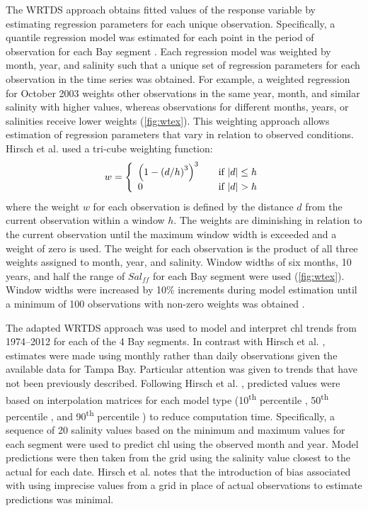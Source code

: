 \documentclass{svjour3}\usepackage[]{graphicx}\usepackage[]{color}
\newcommand{\nine}{90\textsuperscript{th} percentile }
\newcommand{\five}{50\textsuperscript{th} percentile }
\newcommand{\ten}{10\textsuperscript{th} percentile }
\begin{document}
The \ac{WRTDS} approach obtains fitted values of the response variable by estimating regression parameters for each unique observation.  Specifically, a quantile regression model was estimated for each point in the period of observation for each Bay segment \cite{Hirsch10,Hirsch14}. Each regression model was weighted by month, year, and salinity such that a unique set of regression parameters for each observation in the time series was obtained. For example, a weighted regression for October 2003 weights other observations in the same year, month, and similar salinity with higher values, whereas observations for different months, years, or salinities receive lower weights (\cref{fig:wtex}).  This weighting approach allows estimation of regression parameters that vary in relation to observed conditions.  Hirsch et al. \cite{Hirsch10} used a tri-cube weighting function:
\begin{equation}
w= \left\{ 
  \begin{array}{l l}
    \left(1-\left(d/h\right)^3\right)^3 & \quad \textrm{if } |d| \leq h \\
    0 & \quad \textrm{if } |d| > h 
  \end{array} \right.
\end{equation}
\noindent where the weight $w$ for each observation is defined by the distance $d$ from the current observation within a window $h$. The weights are diminishing in relation to the current observation until the maximum window width is exceeded and a weight of zero is used.  The weight for each observation is the product of all three weights assigned to month, year, and salinity.  Window widths of six months, 10 years, and half the range of $Sal_{ff}$ for each Bay segment were used (\cref{fig:wtex}).  Window widths were increased by 10\% increments during model estimation until a minimum of 100 observations with non-zero weights was obtained \cite{Hirsch10}.

The adapted \ac{WRTDS} approach was used to model and interpret \ac{chl} trends from 1974--2012 for each of the 4 Bay segments.  In contrast with Hirsch et al. \cite{Hirsch10}, estimates were made using monthly rather than daily observations given the available data for Tampa Bay.  Particular attention was given to trends that have not been previously described.  Following Hirsch et al. \cite{Hirsch10}, predicted values were based on interpolation matrices for each model type (\ten, \five, and \nine) to reduce computation time.  Specifically, a sequence of 20 salinity values based on the minimum and maximum values for each segment were used to predict \ac{chl} using the observed month and year.  Model predictions were then taken from the grid using the salinity value closest to the actual for each date.  Hirsch et al. \cite{Hirsch10} notes that the introduction of bias associated with using imprecise values from a grid in place of actual observations to estimate predictions was minimal.  
\end{document}
